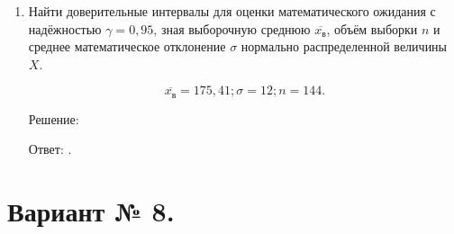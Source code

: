 \documentclass{article}
\begin{document}
\begin{enumerate}
\item %
Найти доверительные интервалы для оценки математического ожидания с надёжностью $\gamma=0,95$, зная выборочную среднюю $\overline{x_\textit{в}}$, объём выборки $n$ и среднее математическое отклонение $\sigma$ нормально распределенной величины $X$.

$$\overline{x_\textit{в}}=175,41; \sigma=12; n=144.$$
\begin{center}Решение:\end{center}

Ответ: $ $.

\end{enumerate}

\section*{Вариант № 8.}
\end{document}
